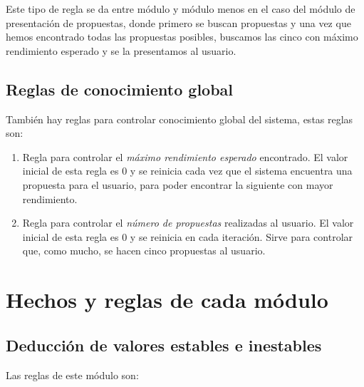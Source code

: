 \documentclass[11pt,openany]{book} %
\begin{document}
Este tipo de regla se da entre módulo y módulo menos en el caso del módulo de presentación de propuestas, donde primero se buscan propuestas y una vez que hemos encontrado todas las propuestas posibles, buscamos las cinco con máximo rendimiento esperado y se la presentamos al usuario.

\subsection{Reglas de conocimiento global}

También hay reglas para controlar conocimiento global del sistema, estas reglas son:

\begin{enumerate}[\qquad\color{ocre}{$\bullet$}]
    \item Regla para controlar el \textit{\textcolor{ocre}{máximo rendimiento esperado}} encontrado. El valor inicial de esta regla es 0 y se reinicia cada vez que el sistema encuentra una propuesta para el usuario, para poder encontrar la siguiente con mayor rendimiento.

    \item Regla para controlar el \textit{\textcolor{ocre}{número de propuestas}} realizadas al usuario. El valor inicial de esta regla es 0 y se reinicia en cada iteración. Sirve para controlar que, como mucho, se hacen cinco propuestas al usuario.
\end{enumerate}

\section{Hechos y reglas de cada módulo}

\subsection{Deducción de valores estables e inestables}

Las reglas de este módulo son:
\end{document}

